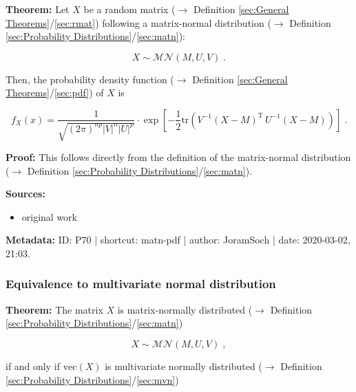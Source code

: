 \documentclass[a4paper,12pt,twoside]{book}
\begin{document}
\textbf{Theorem:} Let $X$ be a random matrix ($\rightarrow$ Definition \ref{sec:General Theorems}/\ref{sec:rmat}) following a matrix-normal distribution ($\rightarrow$ Definition \ref{sec:Probability Distributions}/\ref{sec:matn}):

\begin{equation} \label{eq:matn-pdf-matn}
X \sim \mathcal{MN}(M, U, V) \; .
\end{equation}

Then, the probability density function ($\rightarrow$ Definition \ref{sec:General Theorems}/\ref{sec:pdf}) of $X$ is

\begin{equation} \label{eq:matn-pdf-matn-pdf}
f_X(x) = \frac{1}{\sqrt{(2\pi)^{np} |V|^n |U|^p}} \cdot \exp\left[-\frac{1}{2} \mathrm{tr}\left( V^{-1} (X-M)^\mathrm{T} \, U^{-1} (X-M) \right) \right] \; .
\end{equation}


\vspace{1em}
\textbf{Proof:} This follows directly from the definition of the matrix-normal distribution ($\rightarrow$ Definition \ref{sec:Probability Distributions}/\ref{sec:matn}).


\vspace{1em}
\textbf{Sources:}
\begin{itemize}
\item original work\end{itemize}


\vspace{1em}
\textbf{Metadata:} ID: P70 | shortcut: matn-pdf | author: JoramSoch | date: 2020-03-02, 21:03.
\vspace{1em}



\subsubsection[\textbf{Equivalence to multivariate normal distribution}]{Equivalence to multivariate normal distribution} \label{sec:matn-mvn}
\setcounter{equation}{0}

\textbf{Theorem:} The matrix $X$ is matrix-normally distributed ($\rightarrow$ Definition \ref{sec:Probability Distributions}/\ref{sec:matn})

\begin{equation} \label{eq:matn-mvn-matn}
X \sim \mathcal{MN}(M, U, V) \; ,
\end{equation}

if and only if $\mathrm{vec}(X)$ is multivariate normally distributed ($\rightarrow$ Definition \ref{sec:Probability Distributions}/\ref{sec:mvn})
\end{document}
